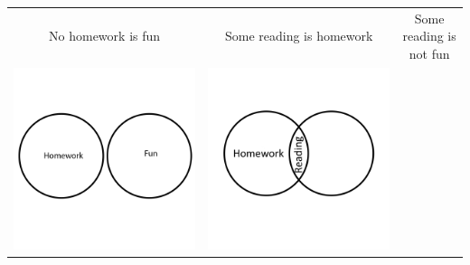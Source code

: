 \documentclass[12pt,a4paper]{report}
\begin{document}
\begin{table}[h!]
  \centering
  \begin{tabular}{  c  c  c }
    No homework is fun & Some reading is homework & Some reading is not fun\\
    \begin{minipage}{.22\textwidth}
      \includegraphics[width=\linewidth]{EulerNoHomeworkFun}
    \end{minipage}
    &
    \begin{minipage}{.22\textwidth}
      \includegraphics[width=\linewidth]{EulerSomeReadingIsHomework}

\end{minipage}
\end{tabular}
\end{table}
\end{document}
